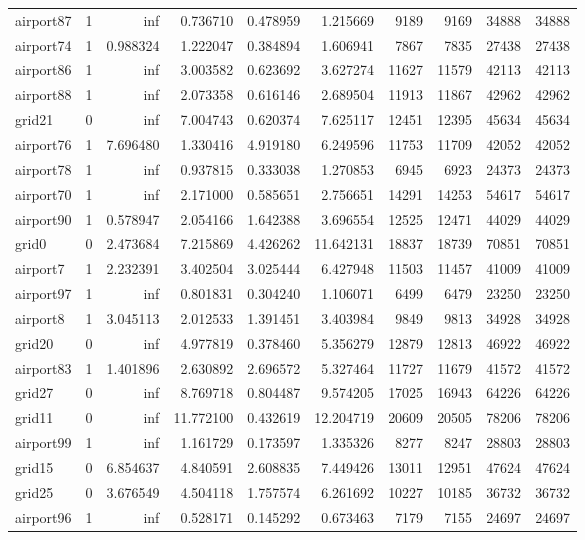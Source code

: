 \begin{longtable}{|l|r|r|r|r|r|r|r|r|r|}
airport87 & 1 & inf & 0.736710 & 0.478959 & 1.215669 & 9189 & 9169 & 34888 & 34888 \\
airport74 & 1 & 0.988324 & 1.222047 & 0.384894 & 1.606941 & 7867 & 7835 & 27438 & 27438 \\
airport86 & 1 & inf & 3.003582 & 0.623692 & 3.627274 & 11627 & 11579 & 42113 & 42113 \\
airport88 & 1 & inf & 2.073358 & 0.616146 & 2.689504 & 11913 & 11867 & 42962 & 42962 \\
grid21 & 0 & inf & 7.004743 & 0.620374 & 7.625117 & 12451 & 12395 & 45634 & 45634 \\
airport76 & 1 & 7.696480 & 1.330416 & 4.919180 & 6.249596 & 11753 & 11709 & 42052 & 42052 \\
airport78 & 1 & inf & 0.937815 & 0.333038 & 1.270853 & 6945 & 6923 & 24373 & 24373 \\
airport70 & 1 & inf & 2.171000 & 0.585651 & 2.756651 & 14291 & 14253 & 54617 & 54617 \\
airport90 & 1 & 0.578947 & 2.054166 & 1.642388 & 3.696554 & 12525 & 12471 & 44029 & 44029 \\
grid0 & 0 & 2.473684 & 7.215869 & 4.426262 & 11.642131 & 18837 & 18739 & 70851 & 70851 \\
airport7 & 1 & 2.232391 & 3.402504 & 3.025444 & 6.427948 & 11503 & 11457 & 41009 & 41009 \\
airport97 & 1 & inf & 0.801831 & 0.304240 & 1.106071 & 6499 & 6479 & 23250 & 23250 \\
airport8 & 1 & 3.045113 & 2.012533 & 1.391451 & 3.403984 & 9849 & 9813 & 34928 & 34928 \\
grid20 & 0 & inf & 4.977819 & 0.378460 & 5.356279 & 12879 & 12813 & 46922 & 46922 \\
airport83 & 1 & 1.401896 & 2.630892 & 2.696572 & 5.327464 & 11727 & 11679 & 41572 & 41572 \\
grid27 & 0 & inf & 8.769718 & 0.804487 & 9.574205 & 17025 & 16943 & 64226 & 64226 \\
grid11 & 0 & inf & 11.772100 & 0.432619 & 12.204719 & 20609 & 20505 & 78206 & 78206 \\
airport99 & 1 & inf & 1.161729 & 0.173597 & 1.335326 & 8277 & 8247 & 28803 & 28803 \\
grid15 & 0 & 6.854637 & 4.840591 & 2.608835 & 7.449426 & 13011 & 12951 & 47624 & 47624 \\
grid25 & 0 & 3.676549 & 4.504118 & 1.757574 & 6.261692 & 10227 & 10185 & 36732 & 36732 \\
airport96 & 1 & inf & 0.528171 & 0.145292 & 0.673463 & 7179 & 7155 & 24697 & 24697 \\

\end{longtable}
